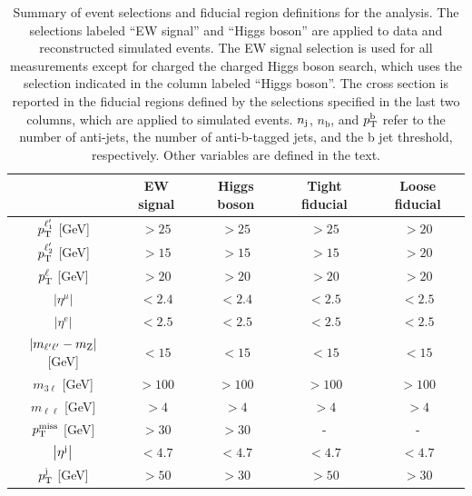 \begin{table}[!ht]
  \begin{center}
  \caption{Summary of event selections and fiducial region definitions for the analysis. 
    The selections labeled ``EW signal'' and ``Higgs boson'' are applied to data and reconstructed 
    simulated events.
    The EW signal selection is used for all measurements except for charged the charged Higgs boson search,
    which uses the selection indicated in the column labeled ``Higgs boson''.
    The \WZjj cross section is reported in the fiducial regions defined by the selections specified in 
    the last two columns, which are applied to simulated events.
    $n_{\mathrm{j}}$, $n_{\mathrm{b}}$, and $p_{\mathrm{T}}^{\mathrm{b}}$ refer to the number of
    anti-\kt jets, the number of anti-\kt b-tagged jets, and the b jet 
    \pt threshold, respectively. Other variables are defined in the text.
    }
  \begin{tabular}{c|c|c|c|c}
  \hline
                                    & EW signal & Higgs boson & Tight fiducial & Loose fiducial\\
    \hline\hline
    $  p_{\mathrm{T}}^{\ell'_{1}}   $ [GeV]    & $> 25$    & $> 25$        & $ > 25 $       & $ > 20 $ \\
    $  p_{\mathrm{T}}^{\ell'_{2}}   $ [GeV]    & $> 15$    & $> 15$        & $ > 15 $       & $ > 20 $ \\
    $  p_{\mathrm{T}}^{\ell}     $ [GeV]       & $> 20$    & $> 20$        & $ > 20 $       & $ > 20 $ \\
  $\left|\eta^{\mu}\right|   $      & $< 2.4$   & $< 2.4$       & $ < 2.5$       & $ < 2.5$ \\
    $\left|\eta^{\mathrm{e}}\right|$      & $< 2.5$   & $< 2.5$       & $ < 2.5$       & $ < 2.5$ \\
  $\left|m_{\ell'\ell'}-m_{\mathrm{Z}}\right|$ [GeV] & $ < 15 $ & $ < 15 $ & $ < 15 $ & $ < 15 $ \\
  $m_{3\ell}                $ [GeV] & $> 100$   & $> 100$       & $> 100$        & $> 100$    \\
  $m_{\ell\ell}           $ [GeV]   & $> 4$     & $> 4$         & $>4$           & $>4$    \\
  $p_{\mathrm{T}}^\text{miss}                  $ [GeV] & $> 30$       & $> 30$     &   -            &   -     \\
  $\left|\eta^{\mathrm{j}}\right|  $      & $< 4.7$   & $< 4.7$       & $< 4.7$        & $< 4.7$ \\
    $p_{\mathrm{T}}^{\mathrm{j}}                $ [GeV] & $ > 50$   & $> 30$        & $> 50$         & $> 30$  \\

\end{tabular}
\end{center}
\end{table}
